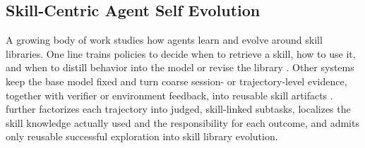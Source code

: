 \subsection{Skill-Centric Agent Self Evolution}
A growing body of work studies how agents learn and evolve around skill libraries. One line trains policies to decide when to retrieve a skill, how to use it, and when to distill behavior into the model or revise the library \citep{xia2026skillrl,wang2025reinforcement,xia2026metaclaw,wang2026openclaw,lu2026skill0,shi2026skill1,ouyang2026skillos}. Other systems keep the base model fixed and turn coarse session- or trajectory-level evidence, together with verifier or environment feedback, into reusable skill artifacts \citep{ni2026trace2skill,alzubi2026evoskill,zhang2026coevoskills,ma2026skillclaw,wang2026skillx,yang2026autoskill,si2026context,zhang2026skillflow,zhou2026memento,skillpro2026,gong2026skillmoo,xu2026multi}. \ours further factorizes each trajectory into judged, skill-linked subtasks, localizes the skill knowledge actually used and the responsibility for each outcome, and admits only reusable successful exploration into skill library evolution.
